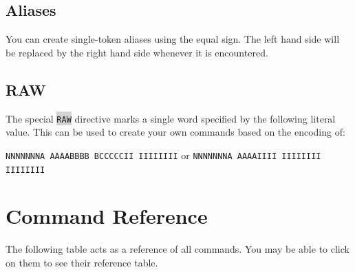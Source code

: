 \documentclass{article}
\newcommand{\vnscode}[1]{\colorbox{lightgray}{\lstinline[language=vns]{#1}}}
\begin{document}
\subsection{Aliases}

You can create single-token aliases using the equal sign. The left hand side
will be replaced by the right hand side whenever it is encountered.

\subsection{RAW}

The special \vnscode{RAW} directive marks a single word specified by the
following literal value. This can be used to create your own commands based on
the encoding of:

\texttt{NNNNNNNA AAAABBBB BCCCCCII IIIIIIII} or \texttt{NNNNNNNA AAAAIIII IIIIIIII IIIIIIII}

\section{Command Reference}

The following table acts as a reference of all commands. You may be able to
click on them to see their reference table.
\end{document}
